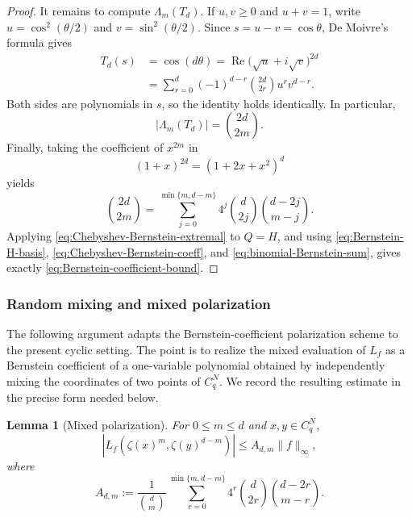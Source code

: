 \documentclass[11pt,a4paper]{article}
\numberwithin{equation}{section}
\theoremstyle{cleanplain}
\newtheorem{lemma}[lemma]{Lemma}
\theoremstyle{cleandefinition}
\theoremstyle{cleanremark}
\begin{document}
{\begin{proof}
It remains to compute $\Lambda_m(T_d)$.  If $u,v\ge0$ and $u+v=1$, write
$u=\cos^2(\theta/2)$ and $v=\sin^2(\theta/2)$.  Since $s=u-v=\cos\theta$,
De Moivre's formula gives
\begin{align*}
 T_d(s)
 &=\cos(d\theta)
 =\operatorname{Re}\bigl(\sqrt u+i\sqrt v\bigr)^{2d}\\
 &=\sum_{r=0}^d(-1)^{d-r}\binom{2d}{2r}u^r v^{d-r}.
\end{align*}
Both sides are polynomials in $s$, so the identity holds identically.  In
particular,
\begin{equation}\label{eq:Chebyshev-Bernstein-coeff}
 |\Lambda_m(T_d)|=\binom{2d}{2m}.
\end{equation}
Finally, taking the coefficient of $x^{2m}$ in
\[
 (1+x)^{2d}=(1+2x+x^2)^d
\]
yields
\begin{equation}\label{eq:binomial-Bernstein-sum}
 \binom{2d}{2m}
 =\sum_{j=0}^{\min\{m,d-m\}}
 4^j\binom d{2j}\binom{d-2j}{m-j}.
\end{equation}
Applying \eqref{eq:Chebyshev-Bernstein-extremal} to $Q=H$, and using
\eqref{eq:Bernstein-H-basis}, \eqref{eq:Chebyshev-Bernstein-coeff}, and
\eqref{eq:binomial-Bernstein-sum}, gives exactly
\eqref{eq:Bernstein-coefficient-bound}.
\end{proof}
}

\subsubsection{Random mixing and mixed polarization}

{\color{black}
The following argument adapts the Bernstein-coefficient polarization scheme to the present cyclic setting.  The point is to realize the mixed evaluation of $L_f$ as a Bernstein coefficient of a one-variable polynomial obtained by independently mixing the coordinates of two points of $C_q^N$.  We record the resulting estimate in the precise form needed below.
}

\begin{lemma}[Mixed polarization]\label{lem:qary-mixed-polarization}
For $0\leq m\leq d$ and $x,y\in C_q^N$,
\begin{equation}\label{eq:qary-mixed-polarization}
 |L_f(\zeta(x)^m,\zeta(y)^{d-m})|
 \leq A_{d,m}\|f\|_\infty,
\end{equation}
where
\begin{equation}\label{eq:Adm-sum-q}
 A_{d,m}
 :=\frac1{\binom dm}
 \sum_{r=0}^{\min\{m,d-m\}}
 4^r\binom d{2r}\binom{d-2r}{m-r}.
\end{equation}
\end{lemma}
\end{document}
